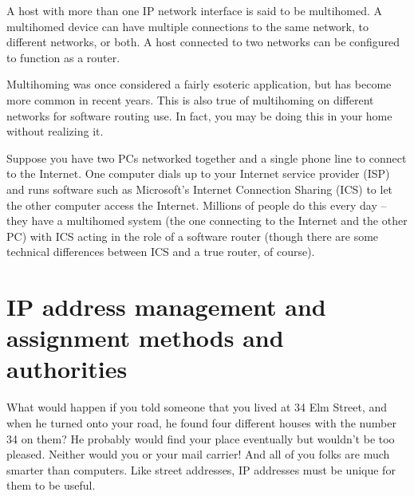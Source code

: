 \begin{keyconcept}
A host with more than one IP network interface is said to be multihomed.
A multihomed device can have multiple connections to the same network, to different networks, or both.
A host connected to two networks can be configured to function as a router.
\end{keyconcept}


Multihoming was once considered a fairly esoteric application, but has
become more common in recent years. This is also true of multihoming on
different networks for software routing use. In fact, you may be doing
this in your home without realizing it.

Suppose you have two PCs networked together and a single phone line to
connect to the Internet. One computer dials up to your Internet service
provider (ISP) and runs software such as Microsoft's Internet
Connection Sharing (ICS) to
let the other computer access the Internet. Millions of people do this
every day -- they have a multihomed system (the one connecting to the
Internet and the other PC) with ICS acting in the role of a software
router (though there are some technical differences between ICS and a
true router, of course).


\section{IP address management and assignment methods and authorities}
What would happen if you told someone that you lived at 34 Elm Street, and when he
turned onto your road, he found four different houses with the number 34
on them? He probably would find your place eventually but wouldn't be
too pleased. Neither would you or your mail carrier! And all of you
folks are much smarter than computers. Like street addresses, IP
addresses must be unique for them to be useful.


